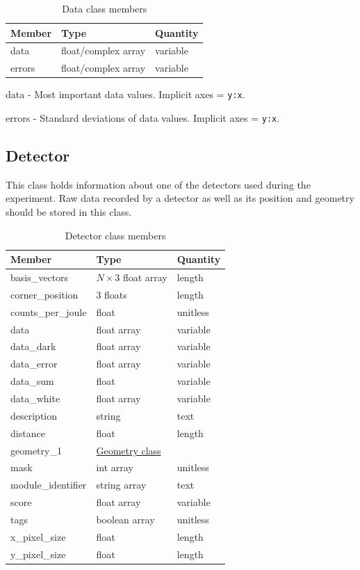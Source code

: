 \documentclass[usletter,11pt]{article}
\newcommand{\member}[2]
{ \noindent
{ \color{softBlue}  #1 - } #2
\vspace{0.2cm}
}
\begin{document}
\begin{table}[h!]\sffamily \footnotesize
\caption{Data class members}

\begin{tabular}{p{4.5cm} p{4.5cm}  p{2.5cm} }
\toprule
\bfseries Member     & \bfseries Type & \bfseries Quantity \\
\midrule
data  & float/complex array & variable  \\
errors  & float/complex array & variable \\
\bottomrule
\end{tabular}
\end{table}

\member{data}{Most important data values. Implicit axes = {\tt y:x}.}

\member{errors}{Standard deviations of data values. Implicit axes = {\tt y:x}.}

\subsection{Detector}
\label{table:detector}

This class holds information about one of the detectors used during
the experiment. Raw data recorded by a detector as well as its position
and geometry should be stored in this class.

\begin{table}[h!]\sffamily \footnotesize
\caption{Detector class members}

\begin{tabular}{p{4.5cm} p{4.5cm}  p{2.5cm} }
\toprule
\bfseries Member     & \bfseries Type & \bfseries Quantity \\
\midrule


basis\_vectors & $N \times 3$ float array & length \\ 
corner\_position & 3 floats & length \\
counts\_per\_joule & float & unitless \\ 
data     & float array & variable  \\
data\_dark & float array & variable \\
data\_error & float array & variable \\
data\_sum & float & variable \\
data\_white & float array & variable \\
description & string & text \\
distance     & float & length\\
geometry\_1 &  \hyperref[table:geometry]{Geometry class} & \\
mask & int array & unitless \\
module\_identifier & string array & text \\
score & float array & variable \\
tags & boolean array & unitless \\
x\_pixel\_size & float & length  \\
y\_pixel\_size & float & length \\
\bottomrule
\end{tabular}
\end{table}
\end{document}
